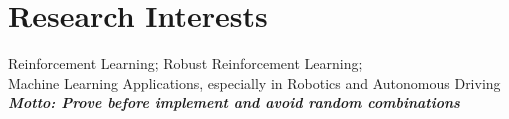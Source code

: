 \section{Research Interests}
    \quad Reinforcement Learning; Robust Reinforcement Learning;
    \\\quad Machine Learning Applications, especially in Robotics and Autonomous Driving\\
    \quad \textit{\textbf{Motto: Prove before implement and avoid random combinations}}
    
